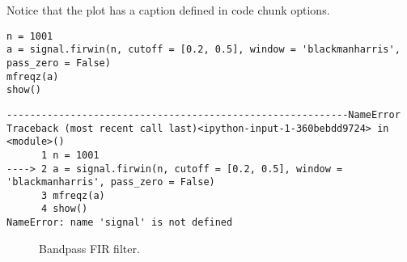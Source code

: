 \documentclass[a4paper,11pt,final]{article}
\begin{document}
Notice that the plot has a caption defined in code chunk options.



\begin{verbatim}
n = 1001
a = signal.firwin(n, cutoff = [0.2, 0.5], window = 'blackmanharris', pass_zero = False)
mfreqz(a)
show()
\end{verbatim}
\begin{verbatim}
-----------------------------------------------------------NameError
Traceback (most recent call last)<ipython-input-1-360bebdd9724> in
<module>()
      1 n = 1001
----> 2 a = signal.firwin(n, cutoff = [0.2, 0.5], window =
'blackmanharris', pass_zero = False)
      3 mfreqz(a)
      4 show()
NameError: name 'signal' is not defined
\end{verbatim}
\begin{figure}[htpb]
\center
\caption{Bandpass FIR filter.}
\label{fig:None}
\end{figure}
\end{document}
